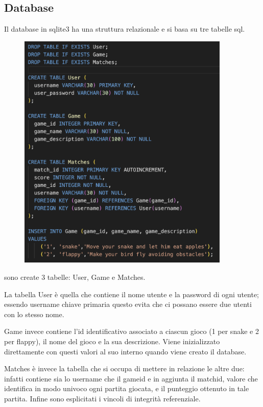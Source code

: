 \documentclass{article}
\begin{document}
\subsection{Database}
Il database in sqlite3 ha una struttura relazionale e si basa su tre tabelle sql.
\begin{figure}[H]
    \centering
    \includegraphics[width=0.9\textwidth]{images/schema_db.png}
\end{figure}

sono create 3 tabelle: User, Game e Matches.

La tabella User è quella che contiene il nome utente e la password di ogni utente; essendo username chiave primaria questo evita che ci possano essere due utenti con lo stesso nome.

Game invece contiene l’id identificativo associato a ciascun gioco (1 per snake e 2 per flappy), il nome del gioco e la sua descrizione. 
Viene inizializzato direttamente con questi valori al suo interno quando viene creato il database.

Matches è invece la tabella che si occupa di mettere in relazione le altre due: infatti contiene sia lo username che il game\textunderscore id e in aggiunta il match\textunderscore id, valore che identifica in modo univoco ogni partita giocata, e il punteggio ottenuto in tale partita. 
Infine sono esplicitati i vincoli di integrità referenziale.
\end{document}
